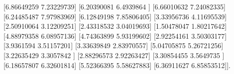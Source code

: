 \documentclass{article}%
\begin{document}
 {[}6.86649259 7.23229739{]}\newline%
 {[}6.20390081 6.4939864 {]}\newline%
 {[}6.66010632 7.24082335{]}\newline%
 {[}6.24485487 7.97983969{]}\newline%
 {[}6.12849198 7.85806405{]}\newline%
 {[}3.33956736 4.11695539{]}\newline%
 {[}2.50910064 3.12209251{]}\newline%
 {[}2.43318532 3.04019693{]}\newline%
 {[}1.50478047 1.80217642{]}\newline%
 {[}4.88979358 6.08957136{]}\newline%
 {[}4.74363899 5.93199602{]}\newline%
 {[}2.92254161 3.50303177{]}\newline%
 {[}3.9361594  3.51157201{]}\newline%
 {[}3.33639849 2.83970557{]}\newline%
 {[}5.04705875 5.26721256{]}\newline%
 {[}3.22635429 3.3057842 {]}\newline%
 {[}2.88296573 2.92263427{]}\newline%
 {[}3.30854455 3.5649735 {]}\newline%
 {[}6.18657807 6.32601814{]}\newline%
 {[}5.52366395 5.58627883{]}\newline%
 {[}6.36911627 6.85853512{]}{]}.\newline%
\newline%

%
\end{document}
